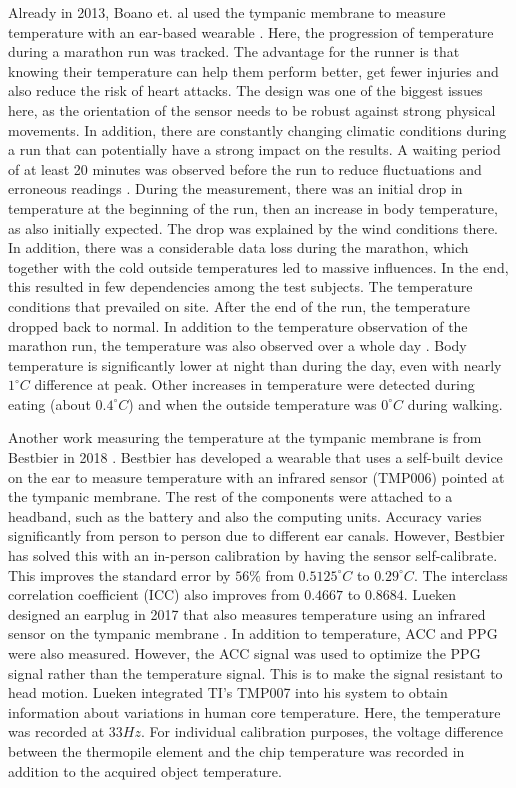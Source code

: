 Already in 2013, Boano et. al used the tympanic membrane to measure temperature with an ear-based wearable \cite{boanoNoninvasiveMeasurementCore2013}. 
Here, the progression of temperature during a marathon run was tracked.
The advantage for the runner is that knowing their temperature can help them perform better, get fewer injuries and also reduce the risk of heart attacks.
The design was one of the biggest issues here, as the orientation of the sensor needs to be robust against strong physical movements.
In addition, there are constantly changing climatic conditions during a run that can potentially have a strong impact on the results.
A waiting period of at least 20 minutes was observed before the run to reduce fluctuations and erroneous readings \cite{chagllae.MeasurementCoreBody2018}.
During the measurement, there was an initial drop in temperature at the beginning of the run, then an increase in body temperature, as also initially expected.
The drop was explained by the wind conditions there.
In addition, there was a considerable data loss during the marathon, which together with the cold outside temperatures led to massive influences. 
In the end, this resulted in few dependencies among the test subjects.
The temperature conditions that prevailed on site. 
After the end of the run, the temperature dropped back to normal.
In addition to the temperature observation of the marathon run, the temperature was also observed over a whole day \cite{boanoNoninvasiveMeasurementCore2013}.
Body temperature is significantly lower at night than during the day, even with nearly $1 ^\circ C$ difference at peak.
Other increases in temperature were detected during eating (about $0.4 ^\circ C$) and when the outside temperature was $0 ^\circ C$ during walking.

Another work measuring the temperature at the tympanic membrane is from Bestbier in 2018 \cite{bestbierDevelopmentVitalSigns2018}.
Bestbier has developed a wearable that uses a self-built device on the ear to measure temperature with an infrared sensor (TMP006) pointed at the tympanic membrane.
The rest of the components were attached to a headband, such as the battery and also the computing units.
Accuracy varies significantly from person to person due to different ear canals.
However, Bestbier has solved this with an in-person calibration by having the sensor self-calibrate.
This improves the standard error by $56\%$ from $0.5125 ^\circ C$ to $0.29 ^\circ C$. The interclass correlation coefficient (ICC) also improves from $0.4667$ to $0.8684$.
Lueken designed an earplug in 2017 that also measures temperature using an infrared sensor on the tympanic membrane \cite{luekenPhotoplethysmographybasedInearSensor2017}.
In addition to temperature, ACC and PPG were also measured.
However, the ACC signal was used to optimize the PPG signal rather than the temperature signal. 
This is to make the signal resistant to head motion.
Lueken integrated TI's TMP007 into his system to obtain information about variations in human core temperature. 
Here, the temperature was recorded at $33 Hz$.
For individual calibration purposes, the voltage difference between the thermopile element and the chip temperature was recorded in addition to the acquired object temperature.

